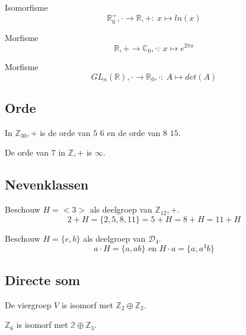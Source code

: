 \documentclass[main.tex]{subfiles}
\begin{document}
\begin{vb}
  Isomorfisme
  \[ \mathbb{R}^{+}_{0},\cdot \rightarrow \mathbb{R},+:\ x \mapsto ln(x) \]
\end{vb}

\begin{vb}
  Morfisme
  \[ \mathbb{R},+ \rightarrow \mathbb{C}_{0},\cdot:\ x \mapsto e^{2\pi x} \]
\end{vb}

\begin{vb}
  Morfisme
  \[ GL_{n}(\mathbb{R}),\cdot \rightarrow \mathbb{R}_{0},\cdot:\ A \mapsto det(A) \]
\end{vb}


\subsection{Orde}


\begin{vb}
  In $\mathbb{Z}_{30},+$ is de orde van $5$ $6$ en de orde van $8$ $15$.
\end{vb}

\begin{vb}
  De orde van $7$ in $\mathbb{Z},+$ is $\infty$.
\end{vb}

\subsection{Nevenklassen}


\begin{vb}
  Beschouw $H= <3>$ als deelgroep van $\mathbb{Z}_{12},+$.
  \[ 2 + H = \{ 2,5,8,11 \} = 5 + H = 8 + H = 11 + H \]
\end{vb}

\begin{vb}
  Beschouw $H = \{e,b\}$ als deelgroep van $\mathcal{D}_{4}$.
  \[ a\cdot H = \{a,ab\} \text{ en } H \cdot a = \{ a,a^{3}b \} \]
\end{vb}

\subsection{Directe som}


\begin{vb}
  De viergroep $V$ is isomorf met $\mathbb{Z}_{2} \oplus \mathbb{Z}_{2}$.
\end{vb}

\begin{vb}
  $\mathbb{Z}_{6}$ is isomorf met $\mathbb{2} \oplus \mathbb{Z}_{3}$.
\end{vb}
\end{document}
